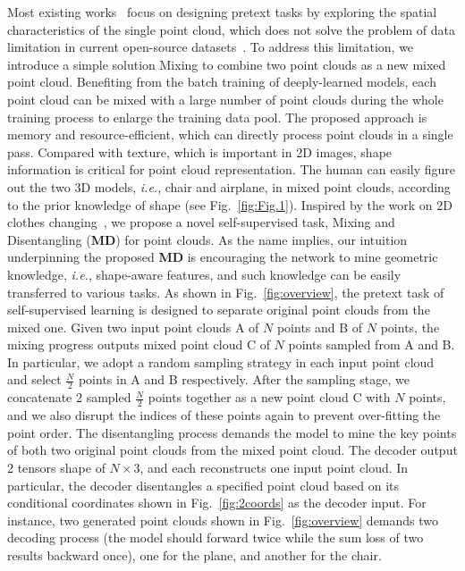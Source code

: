 \documentclass[journal]{IEEEtran}
\def\ie{\emph{i.e.}}
\begin{document}
Most existing works~\cite{sauder2019self, xie2020pointcontrast} focus on designing pretext tasks by exploring the spatial characteristics of the single point cloud, which does not solve the problem of data limitation in current open-source datasets~\cite{wu20153d, yi2016scalable}. 
To address this limitation, we introduce a simple solution Mixing to combine two point clouds as a new mixed point cloud.
Benefiting from the batch training of deeply-learned models, each point cloud can be mixed with a large number of point clouds during the whole training process to enlarge the training data pool. The proposed approach is memory and resource-efficient, which can directly process point clouds in a single pass.
Compared with texture, which is important in 2D images, shape information is critical for point cloud representation. The human can easily figure out the two 3D models, \ie, chair and airplane, in mixed point clouds, according to the prior knowledge of shape (see Fig.~\ref{fig:Fig.1}). 
Inspired by the work on 2D clothes changing~\cite{zheng2019joint}, we propose a novel self-supervised task, Mixing and Disentangling (\textbf{MD}) for point clouds. 
As the name implies, our intuition underpinning the proposed \textbf{MD} is encouraging the network to mine geometric knowledge, \ie, shape-aware features, and such knowledge can be easily transferred to various tasks. 
As shown in Fig.~\ref{fig:overview}, the pretext task of self-supervised learning is designed to separate original point clouds from the mixed one.
Given two input point clouds A of $N$ points and B of $N$ points, the mixing progress outputs mixed point cloud C of $N$ points sampled from A and B. In particular, we adopt a random sampling strategy in each input point cloud and select $\frac{N}{2}$ points in A and B respectively. After the sampling stage, we concatenate 2 sampled $\frac{N}{2}$ points together as a new point cloud C with $N$ points, and we also disrupt the indices of these points again to prevent over-fitting the point order.
The disentangling process demands the model to mine the key points of both two original point clouds from the mixed point cloud.
The decoder output 2 tensors shape of $N\times3$, and each reconstructs one input point cloud. In particular, the decoder disentangles a specified point cloud based on its conditional coordinates shown in Fig.~\ref{fig:2coords} as the decoder input. For instance, two generated point clouds shown in Fig.~\ref{fig:overview} demands two decoding process (the model should forward twice while the sum loss of two results backward once), one for the plane, and another for the chair.
\end{document}
